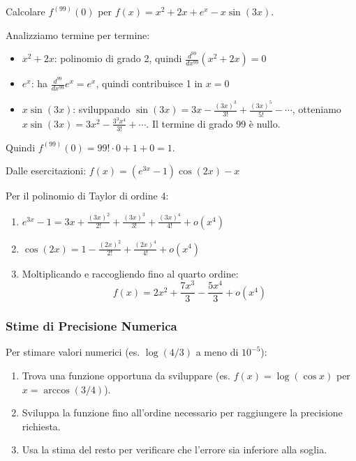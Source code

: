 \begin{esempio}
Calcolare $f^{(99)}(0)$ per $f(x) = x^2 + 2x + e^x - x\sin(3x)$.

Analizziamo termine per termine:
\begin{itemize}
    \item $x^2 + 2x$: polinomio di grado 2, quindi $\frac{d^{99}}{dx^{99}}(x^2 + 2x) = 0$
    \item $e^x$: ha $\frac{d^{99}}{dx^{99}}e^x = e^x$, quindi contribuisce 1 in $x=0$
    \item $x\sin(3x)$: sviluppando $\sin(3x) = 3x - \frac{(3x)^3}{3!} + \frac{(3x)^5}{5!} - \cdots$, otteniamo $x\sin(3x) = 3x^2 - \frac{3^3x^4}{3!} + \cdots$. Il termine di grado 99 è nullo.
\end{itemize}
Quindi $f^{(99)}(0) = 99! \cdot 0 + 1 + 0 = 1$.
\end{esempio}

\begin{esempio}
Dalle esercitazioni: $f(x) = (e^{3x}-1)\cos(2x) - x$

Per il polinomio di Taylor di ordine 4:
\begin{enumerate}
    \item $e^{3x} - 1 = 3x + \frac{(3x)^2}{2!} + \frac{(3x)^3}{3!} + \frac{(3x)^4}{4!} + o(x^4)$
    \item $\cos(2x) = 1 - \frac{(2x)^2}{2!} + \frac{(2x)^4}{4!} + o(x^4)$
    \item Moltiplicando e raccogliendo fino al quarto ordine:
    \[ f(x) = 2x^2 + \frac{7x^3}{3} - \frac{5x^4}{3} + o(x^4) \]
\end{enumerate}
\end{esempio}

\subsubsection{Stime di Precisione Numerica}

\begin{strategia}
Per stimare valori numerici (es. $\log(4/3)$ a meno di $10^{-5}$):
\begin{enumerate}
    \item Trova una funzione opportuna da sviluppare (es. $f(x) = \log(\cos x)$ per $x = \arccos(3/4)$).
    \item Sviluppa la funzione fino all'ordine necessario per raggiungere la precisione richiesta.
    \item Usa la stima del resto per verificare che l'errore sia inferiore alla soglia.
\end{enumerate}
\end{strategia}

